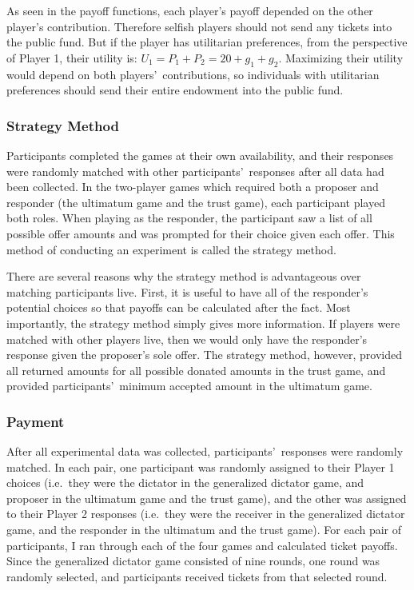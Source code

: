\documentclass[12pt]{article}
\begin{document}
As seen in the payoff functions, each player\rq s payoff depended on the other player\rq s contribution. Therefore selfish players should not send any tickets into the public fund. But if the player has utilitarian preferences, from the perspective of Player 1, their utility is: \(U_{1} = P_{1} + P_{2} =  20 + g_{1} + g_{2}\). Maximizing their utility would depend on both players\rq \ contributions, so individuals with utilitarian preferences should send their entire endowment into the public fund.


\subsubsection{Strategy Method}

Participants completed the games at their own availability, and their responses were randomly matched with other participants\rq \ responses after all data had been collected. In the two-player games which required both a proposer and responder (the ultimatum game and the trust game), each participant played both roles. When playing as the responder, the participant saw a list of all possible offer amounts and was prompted for their choice given each offer. This method of conducting an experiment is called the strategy method.

There are several reasons why the strategy method is advantageous over matching participants live. First, it is useful to have all of the responder\rq s potential choices so that payoffs can be calculated after the fact. Most importantly, the strategy method simply gives more information. If players were matched with other players live, then we would only have the responder\rq s response given the proposer\rq s sole offer. The strategy method, however, provided all returned amounts for all possible donated amounts in the trust game, and provided participants\rq \ minimum accepted amount in the ultimatum game. 

\subsubsection{Payment}

After all experimental data was collected, participants\rq \ responses were randomly matched. In each pair, one participant was randomly assigned to their Player 1 choices (i.e.\ they were the dictator in the generalized dictator game, and proposer in the ultimatum game and the trust game), and the other was assigned to their Player 2 responses (i.e.\ they were the receiver in the generalized dictator game, and the responder in the ultimatum and the trust game). For each pair of participants, I ran through each of the four games and calculated ticket payoffs. Since the generalized dictator game consisted of nine rounds, one round was randomly selected, and participants received tickets from that selected round. 
\end{document}
